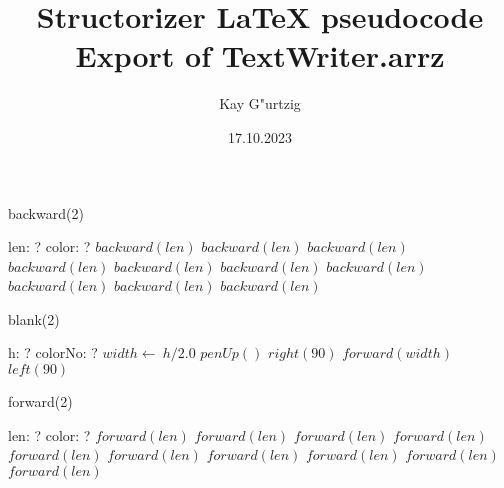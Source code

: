 \documentclass[a4paper,10pt]{article}
\title{Structorizer LaTeX pseudocode Export of TextWriter.arrz}
\author{Kay G"urtzig}
\date{17.10.2023}
\begin{document}
\begin{algorithm}
\caption{backward(2)}
\begin{algorithmic}[5]
    \State len: ?
    \State color: ?
  \EndDecl
      \State \(backward(len)\)
    \EndSelector
      \State \(backward(len)\)
    \EndSelector
      \State \(backward(len)\)
    \EndSelector
      \State \(backward(len)\)
    \EndSelector
      \State \(backward(len)\)
    \EndSelector
      \State \(backward(len)\)
    \EndSelector
      \State \(backward(len)\)
    \EndSelector
      \State \(backward(len)\)
    \EndSelector
      \State \(backward(len)\)
    \EndSelector
      \State \(backward(len)\)
    \EndSelector
  \EndCase
\EndProcedure
\end{algorithmic}
\end{algorithm}


\begin{algorithm}
\caption{blank(2)}
\begin{algorithmic}[5]
\State {}
    \State h: ?
    \State colorNo: ?
  \EndDecl
  \State \(width\gets\ h/2.0\)
  \State \(penUp()\)
  \State \(right(90)\)
  \State \(forward(width)\)
  \State \(left(90)\)
\EndProcedure
\end{algorithmic}
\end{algorithm}


\begin{algorithm}
\caption{forward(2)}
\begin{algorithmic}[5]
    \State len: ?
    \State color: ?
  \EndDecl
      \State \(forward(len)\)
    \EndSelector
      \State \(forward(len)\)
    \EndSelector
      \State \(forward(len)\)
    \EndSelector
      \State \(forward(len)\)
    \EndSelector
      \State \(forward(len)\)
    \EndSelector
      \State \(forward(len)\)
    \EndSelector
      \State \(forward(len)\)
    \EndSelector
      \State \(forward(len)\)
    \EndSelector
      \State \(forward(len)\)
    \EndSelector
      \State \(forward(len)\)
    \EndSelector
  \EndCase
\EndProcedure
\end{algorithmic}
\end{algorithm}
\end{document}
